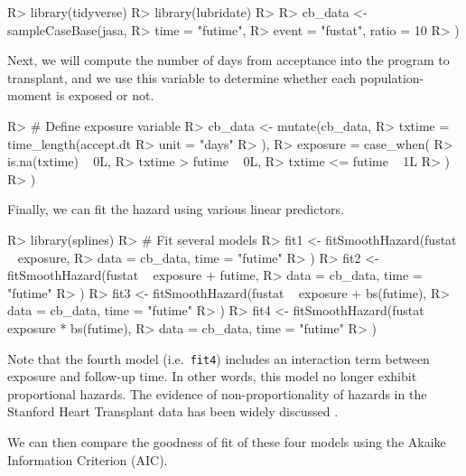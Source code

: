 \documentclass[
]{jss}
\begin{document}
\begin{CodeChunk}

\begin{CodeInput}
R> library(tidyverse)
R> library(lubridate)
R> 
R> cb_data <- sampleCaseBase(jasa,
R>   time = "futime",
R>   event = "fustat", ratio = 10
R> )
\end{CodeInput}
\end{CodeChunk}

Next, we will compute the number of days from acceptance into the
program to transplant, and we use this variable to determine whether
each population-moment is exposed or not.

\begin{CodeChunk}

\begin{CodeInput}
R> # Define exposure variable
R> cb_data <- mutate(cb_data,
R>   txtime = time_length(accept.dt %
R>     unit = "days"
R>   ),
R>   exposure = case_when(
R>     is.na(txtime) ~ 0L,
R>     txtime > futime ~ 0L,
R>     txtime <= futime ~ 1L
R>   )
R> )
\end{CodeInput}
\end{CodeChunk}

Finally, we can fit the hazard using various linear predictors.

\begin{CodeChunk}

\begin{CodeInput}
R> library(splines)
R> # Fit several models
R> fit1 <- fitSmoothHazard(fustat ~ exposure,
R>   data = cb_data, time = "futime"
R> )
R> fit2 <- fitSmoothHazard(fustat ~ exposure + futime,
R>   data = cb_data, time = "futime"
R> )
R> fit3 <- fitSmoothHazard(fustat ~ exposure + bs(futime),
R>   data = cb_data, time = "futime"
R> )
R> fit4 <- fitSmoothHazard(fustat ~ exposure * bs(futime),
R>   data = cb_data, time = "futime"
R> )
\end{CodeInput}
\end{CodeChunk}

Note that the fourth model (i.e.~\texttt{fit4}) includes an interaction
term between exposure and follow-up time. In other words, this model no
longer exhibit proportional hazards. The evidence of non-proportionality
of hazards in the Stanford Heart Transplant data has been widely
discussed \citep{arjas1988graphical}.

We can then compare the goodness of fit of these four models using the
Akaike Information Criterion (AIC).
\end{document}
